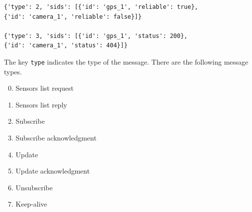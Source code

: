 \begin{verbatim}
{'type': 2, 'sids': [{'id': 'gps_1', 'reliable': true},
{'id': 'camera_1', 'reliable': false}]}
 
{'type': 3, 'sids': [{'id': 'gps_1', 'status': 200},
{'id': 'camera_1', 'status': 404}]}
\end{verbatim}

The key \texttt{type} indicates the type of the message. There are the following
message types.
\begin{enumerate}
   \setcounter{enumi}{-1}
   \item  Sensors list request
   \item  Sensors list reply
   \item  Subscribe 
   \item  Subscribe acknowledgment
   \item  Update 
   \item  Update acknowledgment
   \item  Unsubscribe
   \item  Keep-alive
 \end{enumerate}
